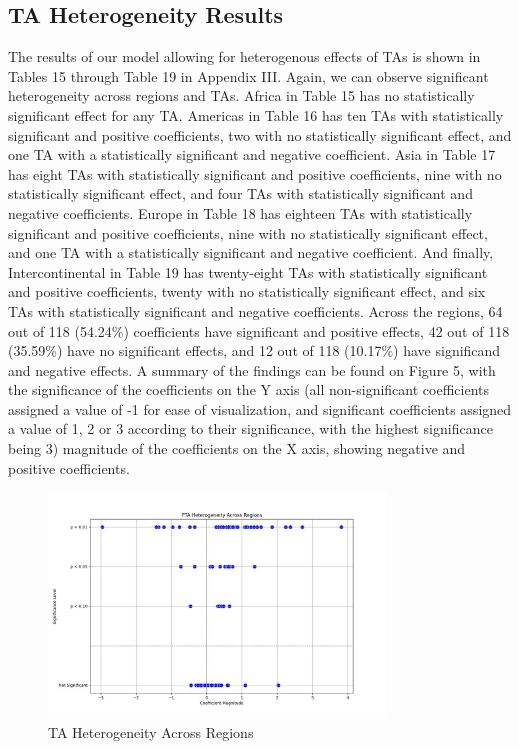 \documentclass[12pt]{article}%
\begin{document}
\subsection{TA Heterogeneity Results}%
\label{subsec:TAHeterogeneityResults}%
The results of our model allowing for heterogenous effects of TAs is
shown in Tables 15 through Table 19 in Appendix III. Again, we can
observe significant heterogeneity across regions and TAs. Africa in
Table 15 has no statistically significant effect for any TA. Americas in
Table 16 has ten TAs with statistically significant and positive
coefficients, two with no statistically significant effect, and one TA
with a statistically significant and negative coefficient. Asia in Table
17 has eight TAs with statistically significant and positive
coefficients, nine with no statistically significant effect, and four
TAs with statistically significant and negative coefficients. Europe in
Table 18 has eighteen TAs with statistically significant and positive
coefficients, nine with no statistically significant effect, and one TA
with a statistically significant and negative coefficient. And finally,
Intercontinental in Table 19 has twenty-eight TAs with statistically
significant and positive coefficients, twenty with no statistically
significant effect, and six TAs with statistically significant and
negative coefficients. Across the regions, 64 out of 118 (54.24\%)
coefficients have significant and positive effects, 42 out of 118
(35.59\%) have no significant effects, and 12 out of 118 (10.17\%) have
significand and negative effects. A summary of the findings can be found
on Figure 5, with the significance of the coefficients on the Y axis (all
non-significant coefficients assigned a value of -1 for ease of
visualization, and significant coefficients assigned a value of 1, 2 or
3 according to their significance, with the highest significance being
3) magnitude of the coefficients on the X axis, showing negative and
positive coefficients.
%


\begin{figure}[h!]%
\centering%
\includegraphics[width=0.8\textwidth]{figures/pta_het_vis.jpeg}%
\caption{TA Heterogeneity Across Regions}%
\end{figure}
\end{document}
